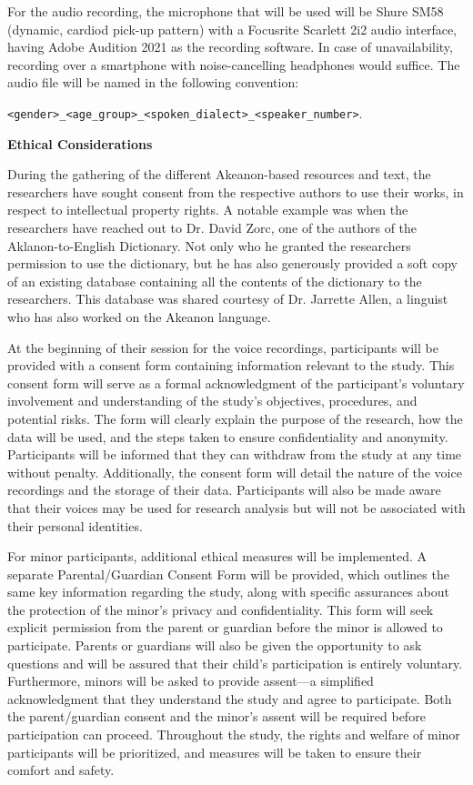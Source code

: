 For the audio recording, the microphone that will be used will be Shure SM58 (dynamic, cardiod pick-up pattern) with a Focusrite Scarlett 2i2 audio interface, having Adobe Audition 2021 as the recording software. In case of unavailability, recording over a smartphone with noise-cancelling headphones would suffice. The audio file will be named in the following convention: 

\texttt{\textless gender\textgreater\_\textless age\_group\textgreater\_\textless spoken\_dialect\textgreater\_\textless speaker\_number\textgreater}.

\textbf{Ethical Considerations}

During the gathering of the different Akeanon-based resources and text, the researchers have sought consent from the respective authors to use their works, in respect to intellectual property rights. A notable example was when the researchers have reached out to Dr. David Zorc, one of the authors of the Aklanon-to-English Dictionary. Not only who he granted the researchers permission to use the dictionary, but he has also generously provided a soft copy of an existing database containing all the contents of the dictionary to the researchers. This database was shared courtesy of Dr. Jarrette Allen, a linguist who has also worked on the Akeanon language.

At the beginning of their session for the voice recordings, participants will be provided with a consent form containing information relevant to the study. This consent form will serve as a formal acknowledgment of the participant's voluntary involvement and understanding of the study's objectives, procedures, and potential risks. The form will clearly explain the purpose of the research, how the data will be used, and the steps taken to ensure confidentiality and anonymity. Participants will be informed that they can withdraw from the study at any time without penalty. Additionally, the consent form will detail the nature of the voice recordings and the storage of their data. Participants will also be made aware that their voices may be used for research analysis but will not be associated with their personal identities.

For minor participants, additional ethical measures will be implemented. A separate Parental/Guardian Consent Form will be provided, which outlines the same key information regarding the study, along with specific assurances about the protection of the minor’s privacy and confidentiality. This form will seek explicit permission from the parent or guardian before the minor is allowed to participate. Parents or guardians will also be given the opportunity to ask questions and will be assured that their child’s participation is entirely voluntary. Furthermore, minors will be asked to provide assent—a simplified acknowledgment that they understand the study and agree to participate. Both the parent/guardian consent and the minor's assent will be required before participation can proceed. Throughout the study, the rights and welfare of minor participants will be prioritized, and measures will be taken to ensure their comfort and safety.

